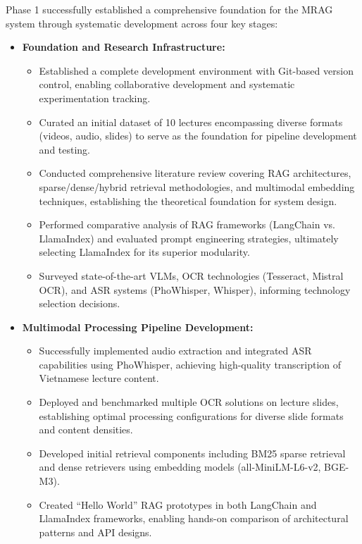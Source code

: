 Phase 1 successfully established a comprehensive foundation for the MRAG system through systematic development across four key stages:

\begin{itemize}
    \item \textbf{Foundation and Research Infrastructure:}
    \begin{itemize}
        \item Established a complete development environment with Git-based version control, enabling collaborative development and systematic experimentation tracking.
        \item Curated an initial dataset of 10 lectures encompassing diverse formats (videos, audio, slides) to serve as the foundation for pipeline development and testing.
        \item Conducted comprehensive literature review covering RAG architectures, sparse/dense/hybrid retrieval methodologies, and multimodal embedding techniques, establishing the theoretical foundation for system design.
        \item Performed comparative analysis of RAG frameworks (LangChain vs. LlamaIndex) and evaluated prompt engineering strategies, ultimately selecting LlamaIndex for its superior modularity.
        \item Surveyed state-of-the-art VLMs, OCR technologies (Tesseract, Mistral OCR), and ASR systems (PhoWhisper, Whisper), informing technology selection decisions.
    \end{itemize}
    
    \item \textbf{Multimodal Processing Pipeline Development:}
    \begin{itemize}
        \item Successfully implemented audio extraction and integrated ASR capabilities using PhoWhisper, achieving high-quality transcription of Vietnamese lecture content.
        \item Deployed and benchmarked multiple OCR solutions on lecture slides, establishing optimal processing configurations for diverse slide formats and content densities.
        \item Developed initial retrieval components including BM25 sparse retrieval and dense retrievers using embedding models (all-MiniLM-L6-v2, BGE-M3).
        \item Created ``Hello World'' RAG prototypes in both LangChain and LlamaIndex frameworks, enabling hands-on comparison of architectural patterns and API designs.
    \end{itemize}


\end{itemize}
